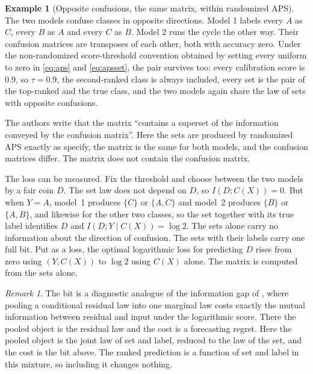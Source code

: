 \documentclass[11pt]{article}
\theoremstyle{definition}
\newtheorem{example}{Example}
\theoremstyle{definition}
\theoremstyle{remark}
\newtheorem*{remark}{Remark}
\newcommand{\set}[1]{\{#1\}}
\begin{document}
\begin{example}[Opposite confusions, the same matrix, within randomized APS]
The two models confuse classes in opposite directions. Model 1 labels every $A$ as $C$, every $B$
as $A$ and every $C$ as $B$. Model 2 runs the cycle the other way. Their confusion matrices are transposes of each other, both with accuracy zero. Under the non-randomized score-threshold convention obtained by setting every uniform to zero in
\eqref{eq:aps} and \eqref{eq:apsset}, the pair survives too: every calibration score is $0.9$, so
$\tau = 0.9$, the
second-ranked class is always included, every set is the pair of the top-ranked and the true class,
and the two models again share the law of sets with opposite confusions.

The authors write that the matrix ``contains a superset of the information conveyed by the confusion
matrix''. Here the sets are produced by randomized APS exactly as \citet{romano2020} specify, the matrix is
the same for both models, and the confusion matrices differ. The matrix does not contain the confusion
matrix.

The loss can be measured. Fix the threshold and choose between the two models by a fair coin $D$.
The set law does not depend on $D$, so $I(D; C(X)) = 0$. But when $Y = A$, model~1 produces $\set{C}$
or $\set{A, C}$ and model~2 produces $\set{B}$ or $\set{A, B}$, and likewise for the other two
classes, so the set together with its true label identifies $D$ and $I(D; Y \mid C(X)) = \log 2$. The sets alone carry no information about the direction of confusion. The sets with their labels
carry one full bit. Put as a loss, the optimal logarithmic loss for predicting $D$ rises from zero using $(Y, C(X))$ to $\log 2$ using $C(X)$ alone. The matrix is computed from the sets alone.
\end{example}

\begin{remark}
The bit is a diagnostic analogue of the information gap of \citet{cotton2026}, where pooling a
conditional residual law into one marginal law costs exactly the mutual information between
residual and input under the logarithmic score. There the pooled object is the residual law and the
cost is a forecasting regret. Here the pooled object is the joint law of set and label, reduced to the law of the set, and the
cost is the bit above. The ranked prediction is a function of set and label in this mixture, so
including it changes nothing.
\end{remark}
\end{document}
